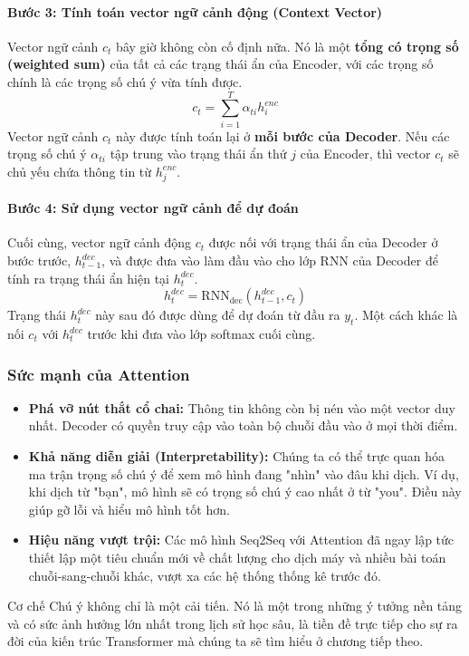 \paragraph{Bước 3: Tính toán vector ngữ cảnh động (Context Vector)}
Vector ngữ cảnh $c_t$ bây giờ không còn cố định nữa. Nó là một \textbf{tổng có trọng số (weighted sum)} của tất cả các trạng thái ẩn của Encoder, với các trọng số chính là các trọng số chú ý vừa tính được.
$$ c_t = \sum_{i=1}^{T} \alpha_{ti} h_i^{enc} $$
Vector ngữ cảnh $c_t$ này được tính toán lại ở \textbf{mỗi bước của Decoder}. Nếu các trọng số chú ý $\alpha_{ti}$ tập trung vào trạng thái ẩn thứ $j$ của Encoder, thì vector $c_t$ sẽ chủ yếu chứa thông tin từ $h_j^{enc}$.

\paragraph{Bước 4: Sử dụng vector ngữ cảnh để dự đoán}
Cuối cùng, vector ngữ cảnh động $c_t$ được nối với trạng thái ẩn của Decoder ở bước trước, $h_{t-1}^{dec}$, và được đưa vào làm đầu vào cho lớp RNN của Decoder để tính ra trạng thái ẩn hiện tại $h_t^{dec}$.
$$ h_t^{dec} = \text{RNN}_{\text{dec}}(h_{t-1}^{dec}, c_t) $$
Trạng thái $h_t^{dec}$ này sau đó được dùng để dự đoán từ đầu ra $y_t$. Một cách khác là nối $c_t$ với $h_t^{dec}$ trước khi đưa vào lớp softmax cuối cùng.

\subsubsection{Sức mạnh của Attention}
\begin{itemize}
    \item \textbf{Phá vỡ nút thắt cổ chai:} Thông tin không còn bị nén vào một vector duy nhất. Decoder có quyền truy cập vào toàn bộ chuỗi đầu vào ở mọi thời điểm.
    \item \textbf{Khả năng diễn giải (Interpretability):} Chúng ta có thể trực quan hóa ma trận trọng số chú ý để xem mô hình đang "nhìn" vào đâu khi dịch. Ví dụ, khi dịch từ "bạn", mô hình sẽ có trọng số chú ý cao nhất ở từ "you". Điều này giúp gỡ lỗi và hiểu mô hình tốt hơn.
    \item \textbf{Hiệu năng vượt trội:} Các mô hình Seq2Seq với Attention đã ngay lập tức thiết lập một tiêu chuẩn mới về chất lượng cho dịch máy và nhiều bài toán chuỗi-sang-chuỗi khác, vượt xa các hệ thống thống kê trước đó.
\end{itemize}

Cơ chế Chú ý không chỉ là một cải tiến. Nó là một trong những ý tưởng nền tảng và có sức ảnh hưởng lớn nhất trong lịch sử học sâu, là tiền đề trực tiếp cho sự ra đời của kiến trúc Transformer mà chúng ta sẽ tìm hiểu ở chương tiếp theo.